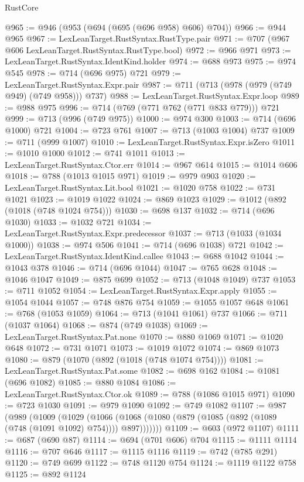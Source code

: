 \begin{lexlean}{RustCore}
\begin{coremodule}
@965 := @946 (@953 (@694 (@695 (@696 @958) @606) @704))
@966 := @944 @965
@967 := LexLeanTarget.RustSyntax.RustType.pair
@971 := @707 (@967 @606 LexLeanTarget.RustSyntax.RustType.bool)
@972 := @966 @971
@973 := LexLeanTarget.RustSyntax.IdentKind.holder
@974 := @688 @973
@975 := @974 @545
@978 := @714 (@696 @975) @721
@979 := LexLeanTarget.RustSyntax.Expr.pair
@987 := @711 (@713 (@978 (@979 (@749 @949) (@749 @958))) @737)
@988 := LexLeanTarget.RustSyntax.Expr.loop
@989 := @988 @975
@996 := @714 (@769 (@771 @762 (@771 @833 @779))) @721
@999 := @713 (@996 (@749 @975))
@1000 := @974 @300
@1003 := @714 (@696 @1000) @721
@1004 := @723 @761
@1007 := @713 (@1003 @1004) @737
@1009 := @711 (@999 @1007)
@1010 := LexLeanTarget.RustSyntax.Expr.isZero
@1011 := @1010 @1000
@1012 := @741 @1011
@1013 := LexLeanTarget.RustSyntax.Ctor.err
@1014 := @967 @614
@1015 := @1014 @606
@1018 := @788 (@1013 @1015 @971)
@1019 := @979 @903
@1020 := LexLeanTarget.RustSyntax.Lit.bool
@1021 := @1020 @758
@1022 := @731 @1021
@1023 := @1019 @1022
@1024 := @869 @1023
@1029 := @1012 (@892 (@1018 (@748 @1024 @754)))
@1030 := @698 @137
@1032 := @714 (@696 @1030)
@1033 := @1032 @721
@1034 := LexLeanTarget.RustSyntax.Expr.predecessor
@1037 := @713 (@1033 (@1034 @1000))
@1038 := @974 @506
@1041 := @714 (@696 @1038) @721
@1042 := LexLeanTarget.RustSyntax.IdentKind.callee
@1043 := @688 @1042
@1044 := @1043 @378
@1046 := @714 (@696 @1044)
@1047 := @765 @628
@1048 := @1046 @1047
@1049 := @875 @699
@1052 := @713 (@1048 @1049) @737
@1053 := @711 @1052
@1054 := LexLeanTarget.RustSyntax.Expr.apply
@1055 := @1054 @1044
@1057 := @748 @876 @754
@1059 := @1055 @1057 @648
@1061 := @768 (@1053 @1059)
@1064 := @713 (@1041 @1061) @737
@1066 := @711 (@1037 @1064)
@1068 := @874 (@749 @1038)
@1069 := LexLeanTarget.RustSyntax.Pat.none
@1070 := @880 @1069
@1071 := @1020 @648
@1072 := @731 @1071
@1073 := @1019 @1072
@1074 := @869 @1073
@1080 := @879 (@1070 (@892 (@1018 (@748 @1074 @754))))
@1081 := LexLeanTarget.RustSyntax.Pat.some
@1082 := @698 @162
@1084 := @1081 (@696 @1082)
@1085 := @880 @1084
@1086 := LexLeanTarget.RustSyntax.Ctor.ok
@1089 := @788 (@1086 @1015 @971)
@1090 := @723 @1030
@1091 := @979 @1090
@1092 := @749 @1082
@1107 := @987
    (@989
      (@1009
        (@1029
          (@1066 (@1068 (@1080 (@879 (@1085 (@892 (@1089 (@748 (@1091 @1092) @754)))) @897)))))))
@1109 := @603 (@972 @1107)
@1111 := @687 (@690 @87)
@1114 := @694 (@701 @606) @704
@1115 := @1111 @1114
@1116 := @707 @646
@1117 := @1115 @1116
@1119 := @742 (@785 @291)
@1120 := @749 @699
@1122 := @748 @1120 @754
@1124 := @1119 @1122 @758
@1125 := @892 @1124

\end{coremodule}
\end{lexlean}
